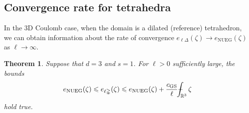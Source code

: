 \documentclass[final,onefignum,onetabnum,reqno]{amsart}
\newtheorem{theorem}{Theorem}[section]
\theoremstyle{remark}
\renewcommand{\le}{\leqslant}
\newcommand{\RR}{\mathbb{R}}
\newcommand{\NUEG}{\mathrm{NUEG}} %
\newcommand{\GS}{\mathrm{GS}} %
\newcommand{\tetra}{\mathbb{\Delta}} %
\def\Xint#1{\mathchoice
{\XXint\displaystyle\textstyle{#1}}%
{\XXint\textstyle\scriptstyle{#1}}%
{\XXint\scriptstyle\scriptscriptstyle{#1}}%
{\XXint\scriptscriptstyle\scriptscriptstyle{#1}}%
\!\int}
\def\XXint#1#2#3{{\setbox0=\hbox{$#1{#2#3}{\int}$ }
\vcenter{\hbox{$#2#3$ }}\kern-.6\wd0}}
\def\dashint{\Xint-}
\begin{document}
\subsection{Convergence rate for tetrahedra}
In the 3D Coulomb case, when the domain is a dilated (reference) tetrahedron, we can 
obtain information about the rate of convergence $e_{\ell\tetra}(\zeta)\to e_\NUEG(\zeta)$ as $\ell\to\infty$. 

\begin{theorem}\label{clconvrate}
Suppose that $d=3$ and $s=1$. For $\ell>0$ sufficiently large, the bounds
$$
e_\NUEG(\zeta)\le e_{\ell\tetra}(\zeta)\le e_\NUEG(\zeta) + \frac{c_\GS}{\ell} \dashint_{\RR^3}\zeta
$$
hold true.
\end{theorem}
\end{document}
